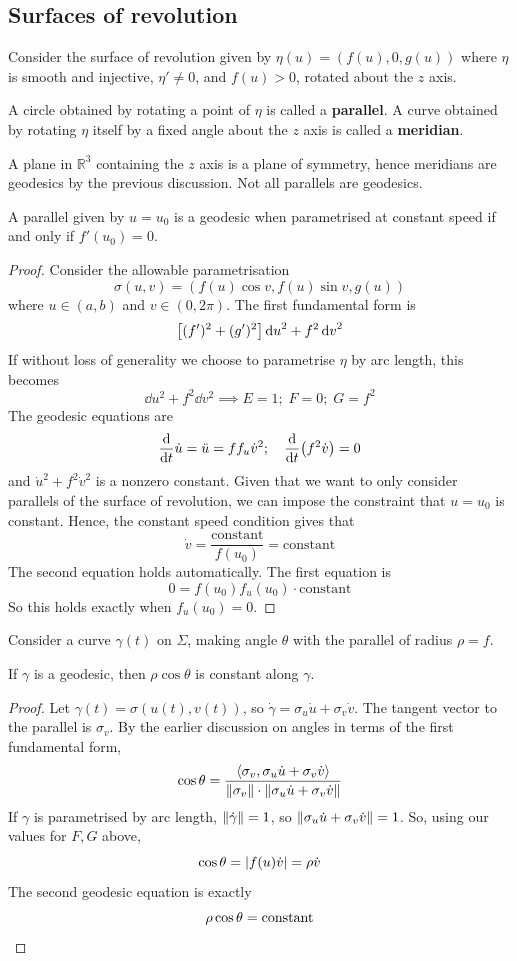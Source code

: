 \documentclass[a4paper]{article}
\begin{document}
\subsection{Surfaces of revolution}
Consider the surface of revolution given by \( \eta(u) = (f(u), 0, g(u)) \) where \( \eta \) is smooth and injective, $ \eta'\neq 0 $, and \( f(u) > 0 \), rotated about the \( z \) axis.
\begin{definition}
	A circle obtained by rotating a point of \( \eta \) is called a \textbf{parallel}.
	A curve obtained by rotating \( \eta \) itself by a fixed angle about the \( z \) axis is called a \textbf{meridian}.
\end{definition}
A plane in \( \mathbb R^3 \) containing the \( z \) axis is a plane of symmetry, hence meridians are geodesics by the previous discussion.
Not all parallels are geodesics.
\begin{lemma}
	A parallel given by \( u = u_0 \) is a geodesic when parametrised at constant speed if and only if \( f'(u_0) = 0 \).
\end{lemma}
\begin{proof}
	Consider the allowable parametrisation
	\[
		\sigma(u,v) = (f(u) \cos v, f(u) \sin v, g(u))
	\]
	where \( u \in (a,b) \) and \( v \in (0,2\pi) \).
	The first fundamental form is
	\[
		\qty[ (f')^2 + (g')^2 ] \dd{u}^2 + f^2 \dd{v}^2
	\]
	If without loss of generality we choose to parametrise \( \eta \) by arc length, this becomes
	\[
		\dd{u}^2 + f^2 \dd{v}^2 \implies E = 1;\;F = 0;\;G = f^2
	\]
	The geodesic equations are
	\[
		\dv{t} \dot u = \ddot u = f f_u \dot v^2;\quad \dv{t} \qty(f^2 \dot v) = 0
	\]
	and \( \dot u^2 + f^2 \dot v^2 \) is a nonzero constant.
	Given that we want to only consider parallels of the surface of revolution, we can impose the constraint that \( u = u_0 \) is constant.
	Hence, the constant speed condition gives that
	\[
		\dot v = \frac{\text{constant}}{f(u_0)} = \text{constant}
	\]
	The second equation holds automatically.
	The first equation is
	\[
		0 = f(u_0) f_u(u_0) \cdot \text{constant}
	\]
	So this holds exactly when \( f_u(u_0) = 0 \).
\end{proof}
Consider a curve \( \gamma(t) \) on \( \Sigma \), making angle \( \theta \) with the parallel of radius \( \rho = f \).
\begin{proposition}
	If \( \gamma \) is a geodesic, then \( \rho \cos \theta \) is constant along \( \gamma \).
\end{proposition}
\begin{proof}
	Let \( \gamma(t) = \sigma(u(t),v(t)) \), so \( \dot\gamma = \sigma_u \dot u + \sigma_v \dot v \).
	The tangent vector to the parallel is \( \sigma_v \).
	By the earlier discussion on angles in terms of the first fundamental form,
	\[
		\cos \theta = \frac{\left\langle{\sigma_v, \sigma_u \dot u + \sigma_v \dot v}\right\rangle}{\norm{\sigma_v} \cdot \norm{\sigma_u \dot u + \sigma_v \dot v}}
	\]
	If \( \gamma \) is parametrised by arc length, \( \norm{\dot \gamma} = 1 \), so \( \norm{\sigma_u \dot u + \sigma_v \dot v} = 1 \).
	So, using our values for \( F, G \) above,
	\[
		\cos \theta = \abs{f(u) \dot v} = \rho \dot v
	\]
	The second geodesic equation is exactly
	\[
		\rho \cos \theta = \text{constant}\qedhere
	\]
\end{proof}
\end{document}

